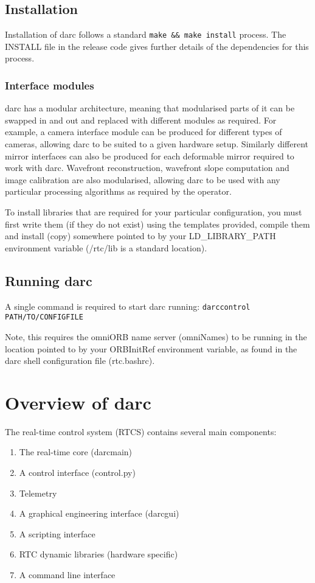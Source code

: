 \documentclass[a4,10pt]{article}
\newcommand{\rtcs}{real-time control system (RTCS)\renewcommand{\rtcs}{RTCS\xspace}\xspace}
\begin{document}
\subsection{Installation}
Installation of darc follows a standard {\tt make \&\& make install}
process.  The INSTALL file in the release code gives further details
of the dependencies for this process.

\subsubsection{Interface modules}
darc has a modular architecture, meaning that modularised parts of it
can be swapped in and out and replaced with different modules as
required.  For example, a camera interface module can be produced for
different types of cameras, allowing darc to be suited to a given
hardware setup.  Similarly different mirror interfaces can also be
produced for each deformable mirror required to work with darc.
Wavefront reconstruction, wavefront slope computation and image
calibration are also modularised, allowing darc to be used with any
particular processing algorithms as required by the operator.

To install libraries that are required for your particular
configuration, you must first write them (if they do not exist) using
the templates provided, compile them and install (copy) somewhere pointed to
by your LD\_LIBRARY\_PATH environment variable (/rtc/lib is a standard
location).

\subsection{Running darc}
A single command is required to start darc running: 
{\tt darccontrol PATH/TO/CONFIGFILE}

Note, this requires the omniORB name server (omniNames) to be running in the
location pointed to by your ORBInitRef environment variable, as found
in the darc shell configuration file (rtc.bashrc).

\section{Overview of darc}
The \rtcs contains several main components:
\begin{enumerate}
\item The real-time core (darcmain)
\item A control interface (control.py)
\item Telemetry
\item A graphical engineering interface (darcgui)
\item A scripting interface
\item RTC dynamic libraries (hardware specific)
\item A command line interface
\end{enumerate}
\end{document}
